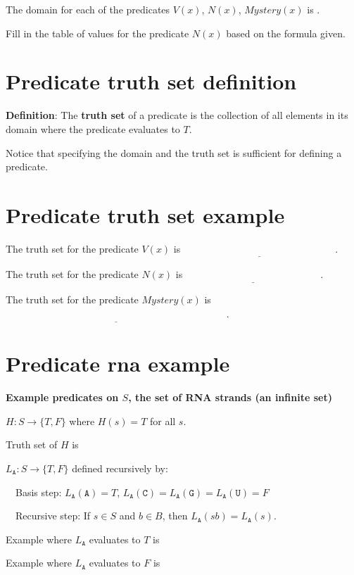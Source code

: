 \documentclass[12pt, oneside]{article}
\newcommand{\A}[0]{\texttt{A}}
\newcommand{\C}[0]{\texttt{C}}
\newcommand{\G}[0]{\texttt{G}}
\newcommand{\U}[0]{\texttt{U}}
\begin{document}
    The domain for each of the predicates $V(x)$, $N(x)$, $Mystery(x)$ is
    \underline{}.

    Fill in the table of values for the predicate $N(x)$ based on the formula given. \vfill
\section*{Predicate truth set definition}


{\bf Definition}: The {\bf truth  set} of a  predicate is the collection of all elements in its
domain where the predicate evaluates to $T$.

Notice that specifying the domain and the truth set is sufficient for defining
a predicate. \vfill
\section*{Predicate truth set example}


The truth set for the predicate $V(x)$ is $\underline{\phantom{\{ x ~\mid~ V(x) = T\} = \{ 001, 010, 011 \}}}$.

The truth set for the predicate $N(x)$ is $\underline{\phantom{\{ x ~\mid~ N(x) = T\} = \{ 101, 111 \}}}$.

The truth set for the predicate $Mystery(x)$ is $\underline{\phantom{\{ x ~\mid~ Mystery(x) = T\} = \{ 000, 001, 010, 101, 111 \}}}$.


\vfill \vfill
\section*{Predicate rna example}


{\bf Example predicates on $S$, the set of RNA strands (an infinite set)}


$H: S \to \{T, F\}$ where $H(s) = T$ for all $s$.

Truth set of $H$ is \underline{}

\vfill

$L_{\A}: S \to \{T, F\}$  defined recursively by: 

~~Basis step: $L_{\A}(\A) = T$, $L_{\A}(\C) = L_{\A}(\G) = L_{\A}(\U) = F$

~~Recursive step: If $s \in S$ and $b \in B$, then $L_{\A}(sb) = L_{\A}(s)$.

Example where $L_{\A}$ evaluates to $T$ is \underline{\phantom{$\A\C\G$~\hspace{1in}}}

\vfill

Example where $L_{\A}$ evaluates to $F$ is \underline{\phantom{$\U\A\C\U$\hspace{1in}}}

\vfill \vfill
\end{document}
